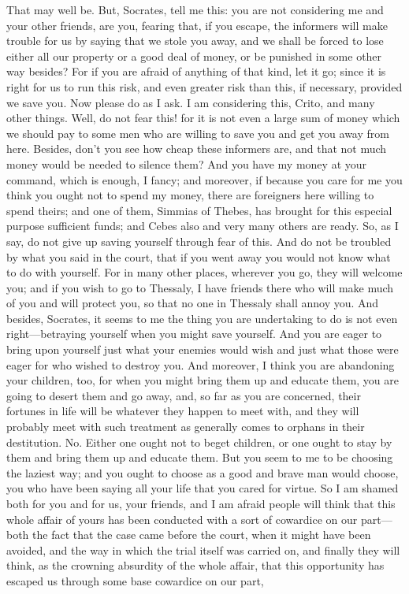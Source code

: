\documentclass[letterpaper,12pt]{article}
\begin{document}
\begin{drama}
\critospeaks 
That may well be. But, Socrates, tell me this: you are not considering me and your other friends, are you, fearing that, if you escape, the informers will make trouble for us by saying that we stole you away, and we shall be forced to lose either all our property or a good deal of money, or be punished in some other way besides?  For if you are afraid of anything of that kind, let it go; since it is right for us to run this risk, and even greater risk than this, if necessary, provided we save you. Now please do as I ask.
\socratesspeaks 
I am considering this, Crito, and many other things.
\critospeaks 
Well, do not fear this! for it is not even a large sum of money which we should pay to some men who are willing to save you and get you away from here. Besides, don't you see how cheap these informers are, and that not much money would be needed to silence them? And you  have my money at your command, which is enough, I fancy; and moreover, if because you care for me you think you ought not to spend my money, there are foreigners here willing to spend theirs; and one of them, Simmias of Thebes, has brought for this especial purpose sufficient funds; and Cebes also and very many others are ready. So, as I say, do not give up saving yourself through fear of this. And do not be troubled by what you said in the court, that if you went away you would not know what to do with yourself. For in many other places, wherever you go,  they will welcome you; and if you wish to go to Thessaly, I have friends there who will make much of you and will protect you, so that no one in Thessaly shall annoy you. And besides, Socrates, it seems to me the thing you are undertaking to do is not even right---betraying yourself when you might save yourself. And you are eager to bring upon yourself just what your enemies would wish and just what those were eager for who wished to destroy you. And moreover, I think you are abandoning your children, too,  for when you might bring them up and educate them, you are going to desert them and go away, and, so far as you are concerned, their fortunes in life will be whatever they happen to meet with, and they will probably meet with such treatment as generally comes to orphans in their destitution. No. Either one ought not to beget children, or one ought to stay by them and bring them up and educate them. But you seem to me to be choosing the laziest way; and you ought to choose as a good and brave man would choose, you who have been saying all your life that you cared for virtue. So I am shamed both for you and for us,  your friends, and I am afraid people will think that this whole affair of yours has been conducted with a sort of cowardice on our part---both the fact that the case came before the court, when it might have been avoided, and the way in which the trial itself was carried on, and finally they will think, as the crowning absurdity of the whole affair, that this opportunity has escaped us through some base cowardice on our part, 
\end{drama}
\end{document}
